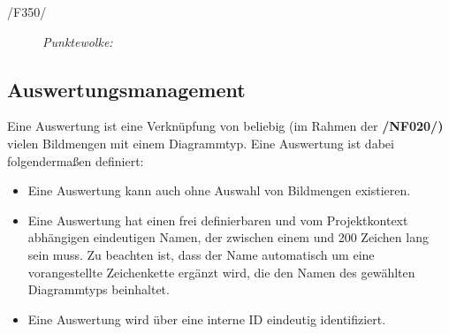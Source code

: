 \begin{description}
		\item[/F350/] \textit{Punktewolke:}\par		
			\begin{figure}[H]
				\centering
			\end{figure}

	\end{description}

\subsection{Auswertungsmanagement}

\label{subsec:auswertungsmgmt}

	Eine Auswertung ist eine Verknüpfung von beliebig (im Rahmen der \textbf{/NF020/)} vielen Bildmengen mit einem Diagrammtyp. Eine Auswertung ist dabei folgendermaßen definiert:

	\begin{itemize}

		\item Eine Auswertung kann auch ohne Auswahl von Bildmengen existieren. 

		\item Eine Auswertung hat einen frei definierbaren und vom Projektkontext abhängigen eindeutigen Namen, der zwischen einem und 200 Zeichen lang sein muss. Zu beachten ist, dass der Name automatisch um eine vorangestellte Zeichenkette ergänzt wird, die den Namen des gewählten Diagrammtyps beinhaltet.

		\item Eine Auswertung wird über eine interne ID eindeutig identifiziert.

	\end{itemize}


